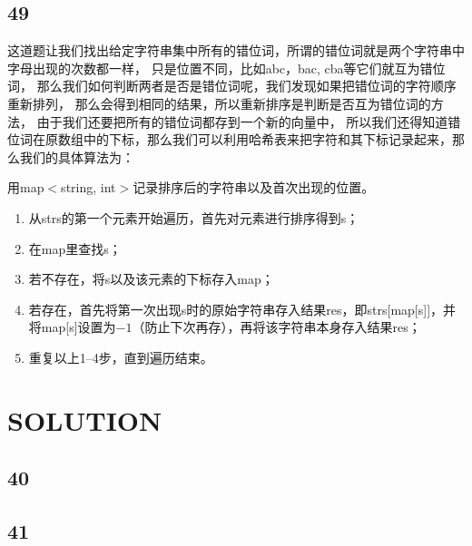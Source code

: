 \documentclass[12pt,a4paper]{article}
\begin{document}
\subsection{49}
\begin{CJK}{UTF8}{gbsn}
这道题让我们找出给定字符串集中所有的错位词，所谓的错位词就是两个字符串中字母出现的次数都一样，
只是位置不同，比如abc，bac, cba等它们就互为错位词，
那么我们如何判断两者是否是错位词呢，我们发现如果把错位词的字符顺序重新排列，
那么会得到相同的结果，所以重新排序是判断是否互为错位词的方法，
由于我们还要把所有的错位词都存到一个新的向量中，
所以我们还得知道错位词在原数组中的下标，那么我们可以利用哈希表来把字符和其下标记录起来，那么我们的具体算法为：
\par
用map$<$string, int$>$记录排序后的字符串以及首次出现的位置。
\begin{enumerate}
\item 从strs的第一个元素开始遍历，首先对元素进行排序得到s；
\item 在map里查找s；
\item 若不存在，将s以及该元素的下标存入map；
\item 若存在，首先将第一次出现s时的原始字符串存入结果res，即strs[map[s]]，并将map[s]设置为$-1$（防止下次再存），再将该字符串本身存入结果res；
\item 重复以上1--4步，直到遍历结束。
\end{enumerate}
\end{CJK}

\section{SOLUTION}
\subsection{40}
\subsection{41}
\end{document}

